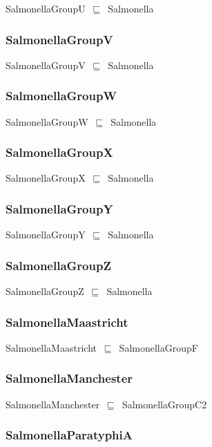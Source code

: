 \documentclass{article}
\begin{document}
SalmonellaGroupU~\ensuremath{\sqsubseteq}~Salmonella~

\subsubsection*{SalmonellaGroupV}

SalmonellaGroupV~\ensuremath{\sqsubseteq}~Salmonella~

\subsubsection*{SalmonellaGroupW}

SalmonellaGroupW~\ensuremath{\sqsubseteq}~Salmonella~

\subsubsection*{SalmonellaGroupX}

SalmonellaGroupX~\ensuremath{\sqsubseteq}~Salmonella~

\subsubsection*{SalmonellaGroupY}

SalmonellaGroupY~\ensuremath{\sqsubseteq}~Salmonella~

\subsubsection*{SalmonellaGroupZ}

SalmonellaGroupZ~\ensuremath{\sqsubseteq}~Salmonella~

\subsubsection*{SalmonellaMaastricht}

SalmonellaMaastricht~\ensuremath{\sqsubseteq}~SalmonellaGroupF~

\subsubsection*{SalmonellaManchester}

SalmonellaManchester~\ensuremath{\sqsubseteq}~SalmonellaGroupC2~

\subsubsection*{SalmonellaParatyphiA}
\end{document}
